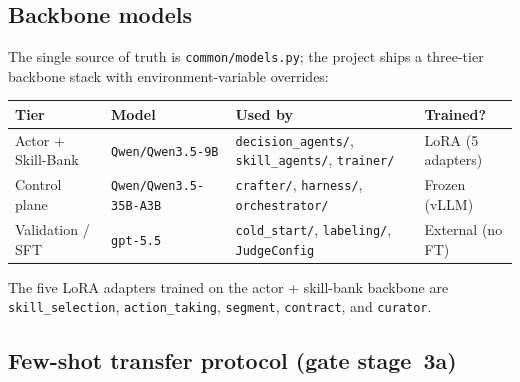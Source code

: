 \subsection{Backbone models}
\label{app:bench-models}

The single source of truth is \texttt{common/models.py}; the project
ships a three-tier backbone stack with environment-variable overrides:
\begin{center}
\small
\begin{tabular}{@{}llll@{}}
\toprule
\textbf{Tier} & \textbf{Model} & \textbf{Used by} & \textbf{Trained?} \\
\midrule
Actor + Skill-Bank   & \texttt{Qwen/Qwen3.5-9B}        & \texttt{decision\_agents/}, \texttt{skill\_agents/}, \texttt{trainer/}   & LoRA (5 adapters) \\
Control plane        & \texttt{Qwen/Qwen3.5-35B-A3B}   & \texttt{crafter/}, \texttt{harness/}, \texttt{orchestrator/}             & Frozen (vLLM) \\
Validation / SFT     & \texttt{gpt-5.5}                & \texttt{cold\_start/}, \texttt{labeling/}, \texttt{JudgeConfig}          & External (no FT) \\
\bottomrule
\end{tabular}
\end{center}
The five LoRA adapters trained on the actor + skill-bank backbone are
\texttt{skill\_selection}, \texttt{action\_taking}, \texttt{segment},
\texttt{contract}, and \texttt{curator}.

\subsection{Few-shot transfer protocol (gate stage~3a)}
\label{app:bench-fewshot}

